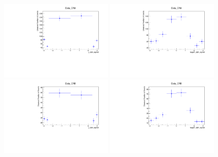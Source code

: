 \begin{figure}[htpb]
  \centering
  \includegraphics[width=0.48\textwidth]{plots/diffx/Data_CRA_jj_dphi_signed.pdf}
  \includegraphics[width=0.48\textwidth]{plots/diffx/Data_CRA_lepgam_dphi_signed.pdf}
  \includegraphics[width=0.48\textwidth]{plots/diffx/Data_CRB_jj_dphi_signed.pdf}
  \includegraphics[width=0.48\textwidth]{plots/diffx/Data_CRB_lepgam_dphi_signed.pdf}
\end{figure}
